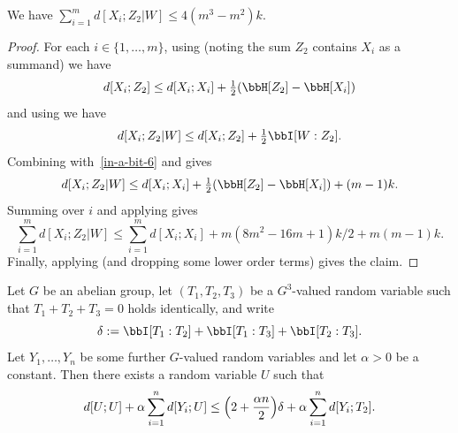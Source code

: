 \begin{lemma}\label{xi-z2-w-dist}\leanok We have $\sum_{i=1}^m d[X_i;Z_2|W] \leq 4(m^3-m^2) k$.
\end{lemma}

\begin{proof}\leanok
  For each $i \in \{1,\dots, m\}$, using  (noting the sum $Z_2$ contains $X_i$ as a summand) we have
  \begin{equation}\label{in-a-bit-6}
    d[X_i;Z_2] \leq d[X_i;X_i] + \tfrac12 (\bbH[Z_2] - \bbH[X_i])
  \end{equation}
  and using  we have
  \[
    d[X_i;Z_2 | W] \leq d[X_i;Z_2] + \tfrac12 \bbI[W : Z_2].
  \]
 Combining with~\eqref{in-a-bit-6} and  gives
 \[ d[X_i;Z_2 | W] \leq d[X_i;X_i] + \tfrac12 (\bbH[Z_2] - \bbH[X_i]) + (m-1)k.\]
 Summing over $i$ and applying  gives
 \[ \sum_{i = 1}^m d[X_i;Z_2 | W] \leq \sum_{i = 1}^m d[X_i;X_i] + m(8m^2-16m+1) k/2 + m(m-1) k.\]
Finally, applying  (and dropping some lower order terms) gives the claim.
\end{proof}

\begin{lemma}
  \label{lem:get-better}\leanok
  Let $G$ be an abelian group, let $(T_1,T_2,T_3)$ be a $G^3$-valued random variable such that $T_1+T_2+T_3=0$ holds identically, and write
  \[
    \delta := \bbI[T_1 : T_2] + \bbI[T_1 : T_3] + \bbI[T_2 : T_3].
  \]
  Let $Y_1,\dots,Y_n$ be some further $G$-valued random variables and let $\alpha>0$ be a constant.
  Then there exists a random variable $U$ such that
  \begin{equation}
    \label{eq:get-better}
    d[U;U] + \alpha \sum_{i=1}^n d[Y_i;U] \leq \Bigl(2 + \frac{\alpha n}{2} \Bigr) \delta + \alpha \sum_{i=1}^n d[Y_i;T_2].
  \end{equation}
\end{lemma}


